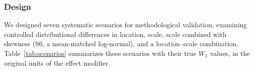 \documentclass[AMA,Times1COL]{WileyNJDv5}
\begin{document}

\subsubsection{Design}\label{sec:sim_design}

We designed seven systematic scenarios for methodological validation, examining controlled distributional differences in location, scale, scale combined with skewness (S6, a mean-matched log-normal), and a location--scale combination. Table~\ref{tab:scenarios} summarizes these scenarios with their true $W_1$ values, in the original units of the effect modifier.
\end{document}
